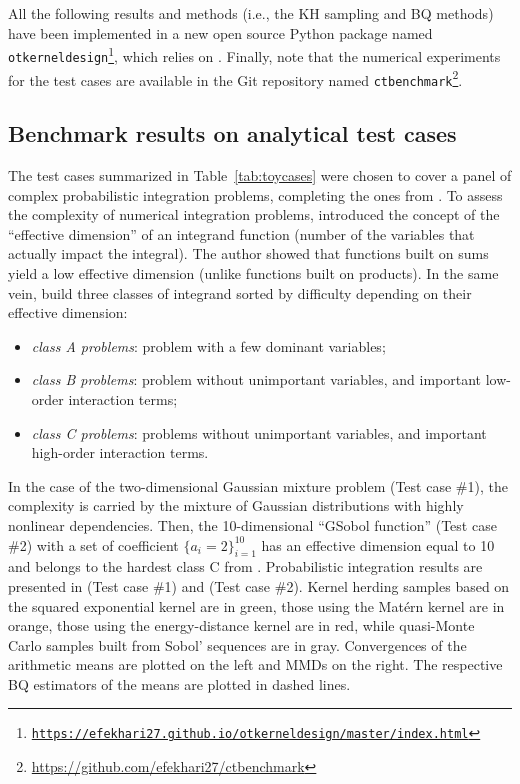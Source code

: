 All the following results and methods (i.e., the KH sampling and BQ methods) have been implemented in a new open source Python package named \texttt{otkerneldesign\footnote{\href{https://efekhari27.github.io/otkerneldesign/master/index.html}{https://efekhari27.github.io/otkerneldesign/master/index.html}}}, which relies on \ot. 
Finally, note that the numerical experiments for the test cases are available in the Git repository named \texttt{ctbenchmark}\footnote{\href{https://github.com/efekhari27/ctbenchmark}{https://github.com/efekhari27/ctbenchmark}}. 


\subsection{Benchmark results on analytical test cases}
The test cases summarized in Table~\ref{tab:toycases} were chosen to cover a panel of complex probabilistic integration problems, completing the ones from \cite{fekhari_renew_2022}.
To assess the complexity of numerical integration problems, \cite{owen_2003} introduced the concept of the ``effective dimension'' of an integrand function (number of the variables that actually impact the integral). 
The author showed that functions built on sums yield a low effective dimension (unlike functions built on products). 
In the same vein, \cite{kucherenko_feil_2011} build three classes of integrand sorted by difficulty depending on their effective dimension: \begin{itemize}
    \item \emph{class A problems}: problem with a few dominant variables;
    \item \emph{class B problems}: problem without unimportant variables, and important low-order interaction terms;
    \item \emph{class C problems}: problems without unimportant variables, and important high-order interaction terms. 
\end{itemize}
In the case of the two-dimensional Gaussian mixture problem (Test case \#1), the complexity is carried by the mixture of Gaussian distributions with highly nonlinear dependencies.
Then, the 10-dimensional ``GSobol function'' (Test case \#2) with a set of coefficient $\{a_i=2\}_{i=1}^{10}$ has an effective dimension equal to 10 and belongs to the hardest class C from \cite{kucherenko_feil_2011}. 
Probabilistic integration results are presented in  (Test case \#1) and  (Test case \#2). 
Kernel herding samples based on the squared exponential kernel are in green, those using the Mat\'{e}rn kernel are in orange, those using the energy-distance kernel are in red, while quasi-Monte Carlo samples built from Sobol' sequences are in gray. 
Convergences of the arithmetic means are plotted on the left and MMDs on the right. 
The respective BQ estimators of the means are plotted in dashed lines. 

